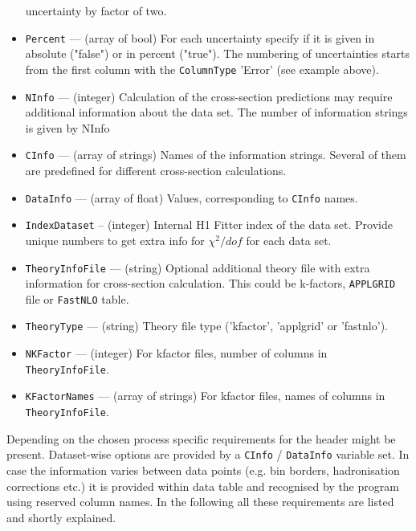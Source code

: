 \begin{itemize}
                      uncertainty by factor of two.                       
      \item {\tt Percent}     --- (array of bool) For each uncertainty specify if it is given in 
                      absolute ("false") or in percent ("true").  The numbering of 
                      uncertainties starts from the first column with the 
                      {\tt ColumnType} 'Error' (see example above).
      \item {\tt NInfo}       --- (integer) Calculation of the cross-section predictions may 
                      require  additional information about the data set. The number of 
                      information strings is given by NInfo
      \item {\tt CInfo}       --- (array of strings) Names of the information strings. 
                      Several of them are predefined for different cross-section 
                      calculations.
      \item {\tt DataInfo}    --- (array of float) Values, corresponding to {\tt CInfo} names.
      \item {\tt IndexDataset} -- (integer) Internal H1 Fitter index of the data set. Provide unique
                      numbers to get extra info for $\chi^2/dof$ for each data set.      
      \item {\tt TheoryInfoFile} --- (string) Optional additional theory file with extra 
                     information for cross-section calculation. This could be k-factors,
                     {\tt APPLGRID} file or {\tt FastNLO} table.  
      \item {\tt TheoryType} --- (string) Theory file type ('kfactor', 'applgrid' or 'fastnlo').      
      \item {\tt NKFactor}   --- (integer) For kfactor files, number of columns in
                     {\tt TheoryInfoFile}.
      \item {\tt KFactorNames} --- (array of strings) For kfactor files, names of columns in 
                     {\tt TheoryInfoFile}.
\end{itemize}

Depending on the chosen process specific requirements for the header might be present. 
Dataset-wise options are provided by a {\tt CInfo} / {\tt DataInfo} variable set. In case the information
varies between data points (e.g. bin borders, hadronisation corrections etc.) it is
provided within data table and recognised by the program using reserved column names.
In the following all these requirements are listed and shortly explained.

